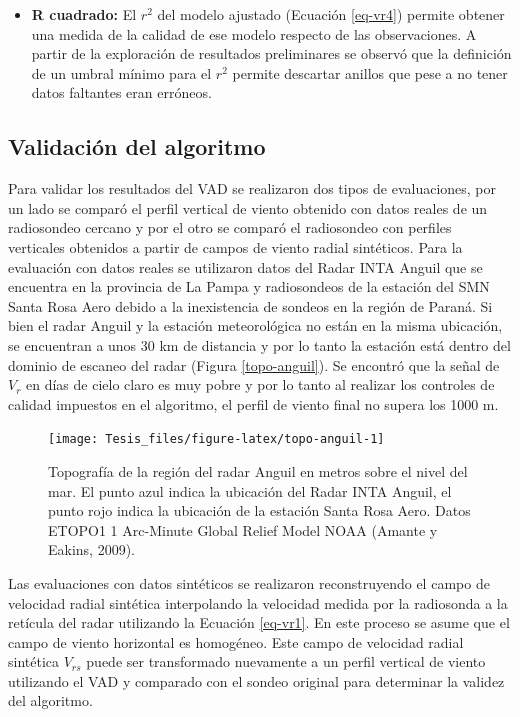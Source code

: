 \documentclass[12pt,spanish,oneside, a4paper]{book}
\providecommand{\tightlist}{%
  \setlength{\itemsep}{0pt}\setlength{\parskip}{0pt}}
\begin{document}
\begin{itemize}
\tightlist
\item
  \textbf{R cuadrado:} El \(r^2\) del modelo ajustado (Ecuación
  \ref{eq-vr4}) permite obtener una medida de la calidad de ese modelo
  respecto de las observaciones. A partir de la exploración de
  resultados preliminares se observó que la definición de un umbral
  mínimo para el \(r^2\) permite descartar anillos que pese a no tener
  datos faltantes eran erróneos.
\end{itemize}

\subsection{Validación del algoritmo}\label{validacion-del-algoritmo}

Para validar los resultados del VAD se realizaron dos tipos de
evaluaciones, por un lado se comparó el perfil vertical de viento
obtenido con datos reales de un radiosondeo cercano y por el otro se
comparó el radiosondeo con perfiles verticales obtenidos a partir de
campos de viento radial sintéticos. Para la evaluación con datos reales
se utilizaron datos del Radar INTA Anguil que se encuentra en la
provincia de La Pampa y radiosondeos de la estación del SMN Santa Rosa
Aero debido a la inexistencia de sondeos en la región de Paraná. Si bien
el radar Anguil y la estación meteorológica no están en la misma
ubicación, se encuentran a unos 30 km de distancia y por lo tanto la
estación está dentro del dominio de escaneo del radar (Figura
\ref{topo-anguil}). Se encontró que la señal de \(V_r\) en días de cielo
claro es muy pobre y por lo tanto al realizar los controles de calidad
impuestos en el algoritmo, el perfil de viento final no supera los 1000
m.

\begin{figure}

{\centering \texttt{[image: Tesis\_files/figure-latex/topo-anguil-1]} 

}

\caption{Topografía de la región del radar Anguil en metros sobre el nivel del mar. El punto azul indica la ubicación del Radar INTA Anguil, el punto rojo indica la ubicación de la estación Santa Rosa Aero. Datos ETOPO1 1 Arc-Minute Global Relief Model NOAA (Amante y Eakins, 2009). \label{topo-anguil}}\label{fig:topo-anguil}
\end{figure}

Las evaluaciones con datos sintéticos se realizaron reconstruyendo el
campo de velocidad radial sintética interpolando la velocidad medida por
la radiosonda a la retícula del radar utilizando la Ecuación
\ref{eq-vr1}. En este proceso se asume que el campo de viento horizontal
es homogéneo. Este campo de velocidad radial sintética \(V_{rs}\) puede
ser transformado nuevamente a un perfil vertical de viento utilizando el
VAD y comparado con el sondeo original para determinar la validez del
algoritmo.
\end{document}
